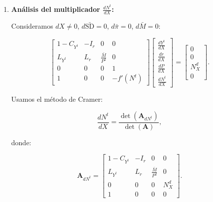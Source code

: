 \documentclass[
  doc,
  floatsintext,
  longtable,
  a4paper,
  nolmodern,
  notxfonts,
  notimes,
  12pt,
  colorlinks=true,linkcolor=blue,citecolor=blue,urlcolor=blue]{apa7}
\begin{document}
\begin{enumerate}
  El primer determinante es 0 (dos filas proporcionales), así que:

  \[
  \det(\mathbf{A}) = \det \begin{bmatrix}
  1 - C_{Y^t} & -I_r & 0 \\
  L_{Y^t} & L_r & \frac{\bar{M}}{P^2} \\
  1 & 0 & 0
  \end{bmatrix}.
  \]

  Expandimos por la tercera fila:

  \[
  \det = 1 \cdot \det \begin{bmatrix}
  -I_r & 0 \\
  L_r & \frac{\bar{M}}{P^2}
  \end{bmatrix} = -I_r \cdot \frac{\bar{M}}{P^2}.
  \]

  Dado que \(I_r < 0\), \(\bar{M} > 0\), \(P > 0\), entonces:

  \[
  \det(\mathbf{A}) = -I_r \frac{\bar{M}}{P^2} > 0.
  \]
\item
  \textbf{Análisis del multiplicador \(\frac{dN^t}{dX}\):}

  Consideramos \(dX \neq 0\), \(d\bar{\mathrm{SD}} = 0\),
  \(d\bar{\pi} = 0\), \(d\bar{M} = 0\):

  \[
  \begin{bmatrix}
  1 - C_{Y^t} & -I_r & 0 & 0 \\
  L_{Y^t} & L_r & \frac{\bar{M}}{P^2} & 0 \\
  0 & 0 & 0 & 1 \\
  1 & 0 & 0 & -f'(N^t)
  \end{bmatrix}
  \begin{bmatrix}
  \frac{dY^t}{dX} \\
  \frac{dr}{dX} \\
  \frac{dP}{dX} \\
  \frac{dN^t}{dX}
  \end{bmatrix}
  =
  \begin{bmatrix}
  0 \\
  0 \\
  N^d_X \\
  0
  \end{bmatrix}.
  \]

  Usamos el método de Cramer:

  \[
  \frac{dN^t}{dX} = \frac{\det(\mathbf{A}_{dN^t})}{\det(\mathbf{A})},
  \]

  donde:

  \[
  \mathbf{A}_{dN^t} = \begin{bmatrix}
  1 - C_{Y^t} & -I_r & 0 & 0 \\
  L_{Y^t} & L_r & \frac{\bar{M}}{P^2} & 0 \\
  0 & 0 & 0 & N^d_X \\
  1 & 0 & 0 & 0
  \end{bmatrix}.
  \]


\end{enumerate}
\end{document}
